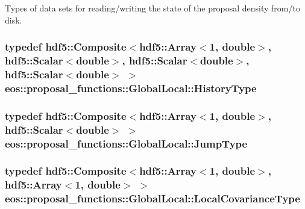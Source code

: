 Types of data sets for reading/writing the state of the proposal density from/to disk. \hypertarget{classeos_1_1proposal__functions_1_1GlobalLocal_ac6705377112dbaacb0141371b3c58b92}{
\subsubsection[{HistoryType}]{\setlength{\rightskip}{0pt plus 5cm}typedef {\bf hdf5::Composite}$<${\bf hdf5::Array}$<$1, double$>$, {\bf hdf5::Scalar}$<$double$>$, {\bf hdf5::Scalar}$<$double$>$, {\bf hdf5::Scalar}$<$double$>$ $>$ {\bf eos::proposal\_\-functions::GlobalLocal::HistoryType}}}
\label{classeos_1_1proposal__functions_1_1GlobalLocal_ac6705377112dbaacb0141371b3c58b92}
\hypertarget{classeos_1_1proposal__functions_1_1GlobalLocal_adaecb155ebcde100eb2f2f9bde76d3d3}{
\subsubsection[{JumpType}]{\setlength{\rightskip}{0pt plus 5cm}typedef {\bf hdf5::Composite}$<${\bf hdf5::Array}$<$1, double$>$, {\bf hdf5::Scalar}$<$double$>$ $>$ {\bf eos::proposal\_\-functions::GlobalLocal::JumpType}}}
\label{classeos_1_1proposal__functions_1_1GlobalLocal_adaecb155ebcde100eb2f2f9bde76d3d3}
\hypertarget{classeos_1_1proposal__functions_1_1GlobalLocal_a512e8526c29f20c96992efc8dcd2da2a}{
\subsubsection[{LocalCovarianceType}]{\setlength{\rightskip}{0pt plus 5cm}typedef {\bf hdf5::Composite}$<${\bf hdf5::Array}$<$1, double$>$, {\bf hdf5::Array}$<$1, double$>$ $>$ {\bf eos::proposal\_\-functions::GlobalLocal::LocalCovarianceType}}}
\label{classeos_1_1proposal__functions_1_1GlobalLocal_a512e8526c29f20c96992efc8dcd2da2a}


